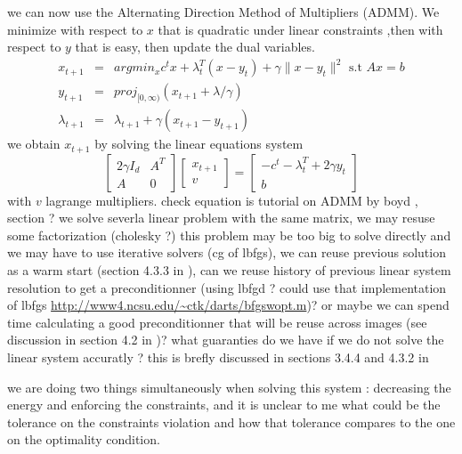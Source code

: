 \documentclass[11pt]{article}
\begin{document}
we can now use the Alternating Direction Method of Multipliers (ADMM).
We minimize with respect to $x$ that is quadratic under linear constraints ,then with respect to $y$ that is easy, then update the dual variables.
\begin{eqnarray}
x_{t+1}&=&argmin_x  c^tx +\lambda_t^T (x-y_t)+\gamma\|x-y_t\|^2 \text{ s.t } Ax=b\\
y_{t+1}&=&proj_{[0,\infty)} (x_{t+1}+\lambda/\gamma)\\
\lambda_{t+1}&=&\lambda_{t+1}+\gamma(x_{t+1}-y_{t+1})
\end{eqnarray}
we obtain $x_{t+1}$ by solving the linear equations system
\begin{equation}
\left[\begin{array}{cc}2\gamma I_d& A^T\\A&0 \end{array}\right]\left[\begin{array}{c}x_{t+1} \\ v\end{array}\right]=\left[\begin{array}{c}-c^t-\lambda_t^T +2\gamma y_t \\ b\end{array}\right]
\end{equation}
with $v$ lagrange multipliers. 
check equation is tutorial on ADMM by boyd , section ? 
we solve severla linear problem with the same matrix, we may resuse some factorization (cholesky  ?) this problem may be too big to solve directly and we may have to use iterative solvers (cg of lbfgs),
we can reuse previous solution as a warm start (section 4.3.3 in  \cite{Boyd2010}),  can we reuse history of previous linear system resolution to get a preconditionner (using lbfgd ? could use that implementation of lbfgs \url{http://www4.ncsu.edu/~ctk/darts/bfgswopt.m})? or maybe we can spend time calculating a good preconditionner that will be reuse across images (see discussion in section 4.2 in \cite{Boyd2010})? 
what guaranties do we have if we do not solve the linear system accuratly ?
this is brefly discussed in sections 3.4.4 and 4.3.2 in  \cite{Boyd2010}

 we are doing two things simultaneously when solving this system : decreasing the energy and enforcing the constraints, and it is unclear to me what could be the tolerance on the constraints violation and how that tolerance compares to the one on the optimality condition. 
\end{document}
